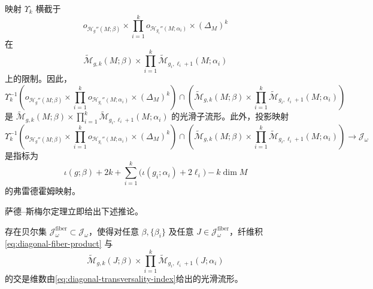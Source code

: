 \begin{theorem}\label{thm:universal-diagonal-transversality}
映射 $\Upsilon_k$ 横截于
\[
 o_{\mathcal H_g''(M;\beta)}\times
 \prod_{i=1}^k o_{\mathcal H_{g_i}''(M;\alpha_i)}
 \times(\Delta_M)^k
\]
在
\[
 \widetilde{\mathcal M}_{g,k}(M;\beta)\times
 \prod_{i=1}^k\widetilde{\mathcal M}_{g_i,\ell_i+1}(M;\alpha_i)
\]
上的限制。因此，
\[
 \Upsilon_k^{-1}\left(
 o_{\mathcal H_g''(M;\beta)}\times
 \prod_{i=1}^k o_{\mathcal H_{g_i}''(M;\alpha_i)}
 \times(\Delta_M)^k\right)
 \cap
 \left(\widetilde{\mathcal M}_{g,k}(M;\beta)\times
 \prod_{i=1}^k\widetilde{\mathcal M}_{g_i,\ell_i+1}(M;\alpha_i)\right)
\]
是
$\widetilde{\mathcal M}_{g,k}(M;\beta)\times
\prod_{i=1}^k\widetilde{\mathcal M}_{g_i,\ell_i+1}(M;\alpha_i)$ 的光滑子流形。此外，投影映射
\[
 \Upsilon_k^{-1}\left(
 o_{\mathcal H_g''(M;\beta)}\times
 \prod_{i=1}^k o_{\mathcal H_{g_i}''(M;\alpha_i)}
 \times(\Delta_M)^k\right)
 \cap
 \left(\widetilde{\mathcal M}_{g,k}(M;\beta)\times
 \prod_{i=1}^k\widetilde{\mathcal M}_{g_i,\ell_i+1}(M;\alpha_i)\right)
 \longrightarrow\mathcal J_\omega
\]
是指标为
\begin{equation}
 \iota(g;\beta)+2k+
 \sum_{i=1}^k\bigl(\iota(g_i;\alpha_i)+2\ell_i\bigr)
 -k\dim M
 \label{eq:diagonal-transversality-index}
\end{equation}
的弗雷德霍姆映射。
\end{theorem}

萨德--斯梅尔定理立即给出下述推论。

\begin{corollary}\label{cor:generic-diagonal-fiber-products}
存在贝尔集 $\mathcal J_\omega^{\mathrm{fiber}}\subset\mathcal J_\omega$，使得对任意
$\beta,\{\beta_i\}$ 及任意
$J\in\mathcal J_\omega^{\mathrm{fiber}}$，纤维积
\eqref{eq:diagonal-fiber-product} 与
\[
 \widetilde{\mathcal M}_{g,k}(J;\beta)\times
 \prod_{i=1}^k\widetilde{\mathcal M}_{g_i,\ell_i+1}(J;\alpha_i)
\]
的交是维数由\eqref{eq:diagonal-transversality-index}给出的光滑流形。
\end{corollary}
